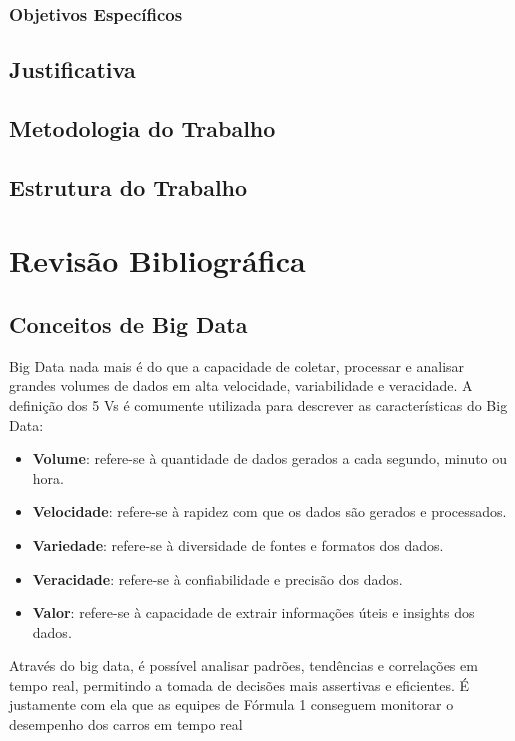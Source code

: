\documentclass[12pt, %
openright, 
oneside, %
a4paper,    %
brazil]{facom-ufu-abntex2}
\begin{document}
\subsection{Objetivos Específicos}
\section{Justificativa}
\section{Metodologia do Trabalho}
\section{Estrutura do Trabalho}


\chapter{Revisão Bibliográfica}
\section{Conceitos de Big Data}
Big Data nada mais é do que a capacidade de coletar, processar e analisar grandes volumes de dados em alta velocidade,
variabilidade e veracidade. A definição dos 5 Vs é comumente utilizada para descrever as características do Big Data:

\begin{itemize}
    \item \textbf{Volume}: refere-se à quantidade de dados gerados a cada segundo, minuto ou hora. 
    \item \textbf{Velocidade}: refere-se à rapidez com que os dados são gerados e processados.
    \item \textbf{Variedade}: refere-se à diversidade de fontes e formatos dos dados.
    \item \textbf{Veracidade}: refere-se à confiabilidade e precisão dos dados.
    \item \textbf{Valor}: refere-se à capacidade de extrair informações úteis e insights dos dados.
\end{itemize}

Através do big data, é possível analisar padrões, tendências e correlações em tempo real, permitindo a tomada de decisões mais assertivas
e eficientes. É justamente com ela que as equipes de Fórmula 1 conseguem monitorar o desempenho dos carros em tempo real
\end{document}
